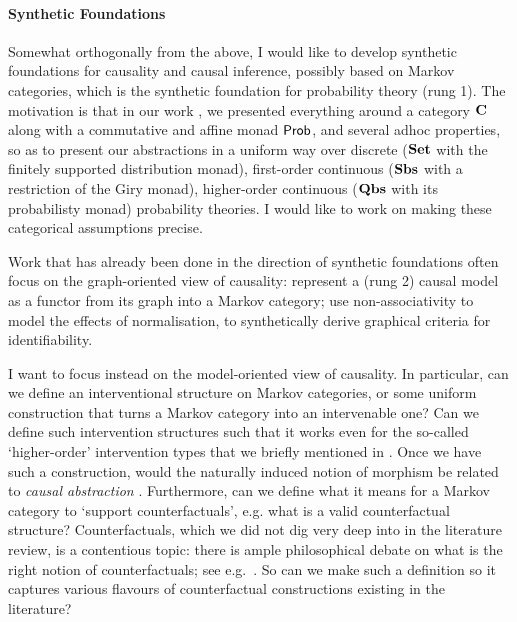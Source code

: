 \documentclass[11pt,a4paper]{article}
\begin{document}
\paragraph{Synthetic Foundations} Somewhat orthogonally from the above, I would like to develop synthetic foundations for causality and causal inference, possibly based on Markov categories, which is the synthetic foundation for probability theory (rung 1). The motivation is that in our work \cite{wang2026causalppl}, we presented everything around a category $\mathbf{C}$ along with a commutative and affine monad $\mathsf{Prob}$, and several adhoc properties, so as to present our abstractions in a uniform way over discrete ($\mathbf{Set}$ with the finitely supported distribution monad), first-order continuous ($\mathbf{Sbs}$ with a restriction of the Giry monad), higher-order continuous ($\mathbf{Qbs}$ with its probabilisty monad) probability theories. I would like to work on making these categorical assumptions precise.

Work that has already been done in the direction of synthetic foundations \cite{jacobs2019causal,jacobsszelesstein2025inference,lorenz2023causalmodelsstringdiagrams, dilavore2026normalizedprobabilisticsemanticsassociative} often focus on the graph-oriented view of causality: \cite{jacobs2019causal,jacobsszelesstein2025inference} represent a (rung 2) causal model as a functor from its graph into a Markov category; \cite{dilavore2026normalizedprobabilisticsemanticsassociative} use non-associativity to model the effects of normalisation, to synthetically derive graphical criteria for identifiability. 

I want to focus instead on the model-oriented view of causality. In particular, can we define an interventional structure on Markov categories, or some uniform construction that turns a Markov category into an intervenable one? Can we define such intervention structures such that it works even for the so-called `higher-order' intervention types that we briefly mentioned in . Once we have such a construction, would the naturally induced notion of morphism be related to \emph{causal abstraction} . Furthermore, can we define what it means for a Markov category to `support counterfactuals', e.g. what is a valid counterfactual structure? Counterfactuals, which we did not dig very deep into in the literature review, is a contentious topic: there is ample philosophical debate on what is the right notion of counterfactuals; see e.g.\ . So can we make such a definition so it captures various flavours of counterfactual constructions existing in the literature? 
\end{document}

